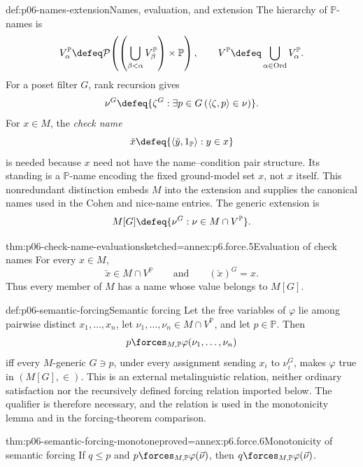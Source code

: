 \begin{hbdefinition}{def:p06-names-extension}{Names, evaluation, and extension}
The hierarchy of \(\mathbb P\)-names is
\[
  V^{\mathbb P}_\alpha
  \defeq
  \mathcal P\!\left(
    \left(\bigcup_{\beta<\alpha}V^{\mathbb P}_\beta\right)
    \times\mathbb P
  \right),
  \qquad
  V^{\mathbb P}\defeq
  \bigcup_{\alpha\in\operatorname{Ord}}V^{\mathbb P}_\alpha.
\]
For a poset filter \(G\), rank recursion gives
\[
  \nu^G\defeq
  \{\zeta^G:\exists p\in G\,(\langle\zeta,p\rangle\in\nu)\}.
\]
For \(x\in M\), the \emph{check name}
\[
  \check x\defeq
  \{\langle\check y,1_{\mathbb P}\rangle:y\in x\}
\]
is needed because \(x\) need not have the name--condition pair structure.
Its standing is a \(\mathbb P\)-name encoding the fixed ground-model set
\(x\), not \(x\) itself.  This nonredundant distinction embeds \(M\) into the
extension and supplies the canonical names used in the Cohen and nice-name
entries.  The generic extension is
\[
  M[G]\defeq
  \{\nu^G:\nu\in M\cap V^{\mathbb P}\}.
\]
\end{hbdefinition}

\begin{hblemma}{thm:p06-check-name-evaluation}{sketched=annex:p6.force.5}{Evaluation of check names}
For every \(x\in M\),
\[
  \check x\in M\cap V^{\mathbb P}
  \qquad\text{and}\qquad
  (\check x)^G=x.
\]
Thus every member of \(M\) has a name whose value belongs to \(M[G]\).
\end{hblemma}

\begin{hbdefinition}{def:p06-semantic-forcing}{Semantic forcing}
Let the free variables of \(\varphi\) lie among pairwise distinct
\(x_1,\ldots,x_n\), let
\(\nu_1,\ldots,\nu_n\in M\cap V^{\mathbb P}\), and let \(p\in\mathbb P\).
Then
\[
  p\forces_{M,\mathbb P}
  \varphi(\nu_1,\ldots,\nu_n)
\]
  iff every \(M\)-generic \(G\ni p\), under every assignment sending \(x_i\) to
\(\nu_i^G\), makes \(\varphi\) true in \((M[G],\in)\).  This is an external
metalinguistic relation, neither ordinary satisfaction nor the recursively
defined forcing relation imported below.  The qualifier is therefore
necessary, and the relation is used in the monotonicity lemma and in the
forcing-theorem comparison.
\end{hbdefinition}

\begin{hblemma}{thm:p06-semantic-forcing-monotone}{proved=annex:p6.force.6}{Monotonicity of semantic forcing}
If \(q\leq p\) and
\(p\forces_{M,\mathbb P}\varphi(\vec\nu)\), then
\(q\forces_{M,\mathbb P}\varphi(\vec\nu)\).
\end{hblemma}

